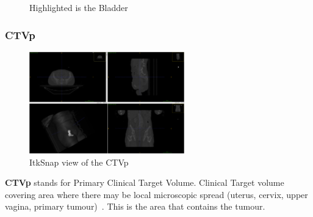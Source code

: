 \documentclass[11pt]{article}
\begin{document}
\begin{figure}[H]
    \centering
    \caption{Highlighted is the Bladder}\label{fig:Anorectum}
\end{figure}

\subsubsection{CTVp}

\begin{figure}[H]
    \centering
    \includegraphics[width=0.6\textwidth]{images/CTVp.png}
    \caption{ItkSnap view of the CTVp}\label{fig:CTVn}
\end{figure}

\textbf{CTVp} stands for Primary Clinical Target Volume. Clinical Target volume covering area where there may be local microscopic spread (uterus, cervix, upper vagina, primary tumour)~\cite{AMLART-data}. This is the area that contains the tumour.
\end{document}
